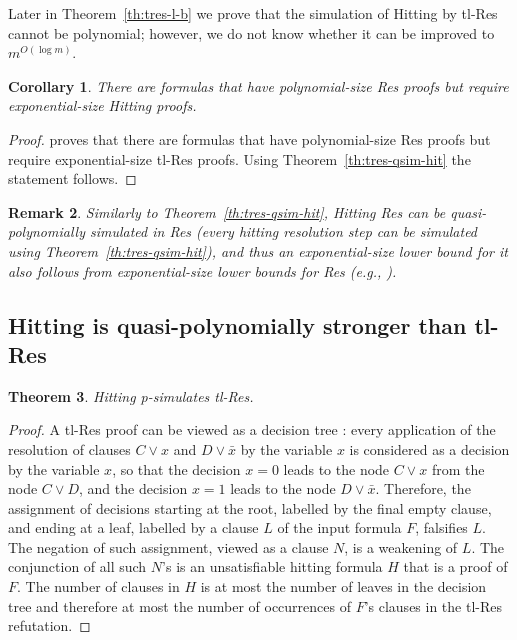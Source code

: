 \documentclass[11pt]{article}
\newcommand{\scterm}[1]{{\textrm{\sc #1}}}
\newcommand{\hit}{\scterm{Hitting}}
\newcommand{\tres}{\scterm{tl-Res}}
\newcommand{\res}{\scterm{Res}}
\newcommand{\hitres}{{\hit} {\res}}
\numberwithin{equation}{section}
\newtheorem{theorem}{Theorem}[section]
\newtheorem{corollary}[theorem]{Corollary}
\newtheorem{remark}[theorem]{Remark}
\begin{document}

Later in Theorem~\ref{th:tres-l-b} we prove that the simulation of {\hit} by {\tres} cannot be polynomial; however, we do not know whether it can be improved to $m^{O(\log m)}$.

\begin{corollary}\label{cor:hit-vs-res}
There are formulas that have polynomial-size {\res} proofs but require exponential-size {\hit} proofs.
\end{corollary}
\begin{proof}
\cite{BIW04} proves that there are formulas that have polynomial-size {\res} proofs but require exponential-size {\tres} proofs. Using Theorem~\ref{th:tres-qsim-hit} the statement follows.
\end{proof}
\begin{remark}
Similarly to Theorem~\ref{th:tres-qsim-hit},
{\hitres} can be quasi-polynomially simulated in {\res}
(every hitting resolution step can be simulated using  Theorem~\ref{th:tres-qsim-hit}),
and thus an exponential-size lower bound for it also follows from
exponential-size lower bounds for {\res} (e.g., \cite{Urq87}).
\end{remark}

\subsection{{\hit} is quasi-polynomially stronger than {\tres}}
\begin{theorem}\label{th:hit-sim-tres} {\hit} p-simulates {\tres}.
\end{theorem}
\begin{proof}
A {\tres} proof can be viewed as a decision tree \cite{BIW04}:
every application of the resolution of clauses $C\vee x$ and $D\vee\bar{x}$ by the variable $x$
is considered as a decision by the variable $x$, so that the decision
$x=0$ leads to the node $C\vee x$ from the node $C\vee D$,
and the decision $x=1$ leads to the node $D\vee\bar{x}$.
Therefore, the assignment of decisions starting at the root, labelled by the final empty clause,
and ending at a leaf, labelled by a clause $L$ of the input formula $F$,
falsifies $L$. The negation of such assignment, viewed as a clause $N$,
is a weakening of $L$. The conjunction of all such $N$'s 
is an unsatisfiable hitting formula $H$ that is a proof of $F$.
The number of clauses in $H$ is at most the number of leaves in the decision tree and therefore at most
the number of occurrences of $F$'s clauses in the {\tres} refutation.
\end{proof}
\end{document}
